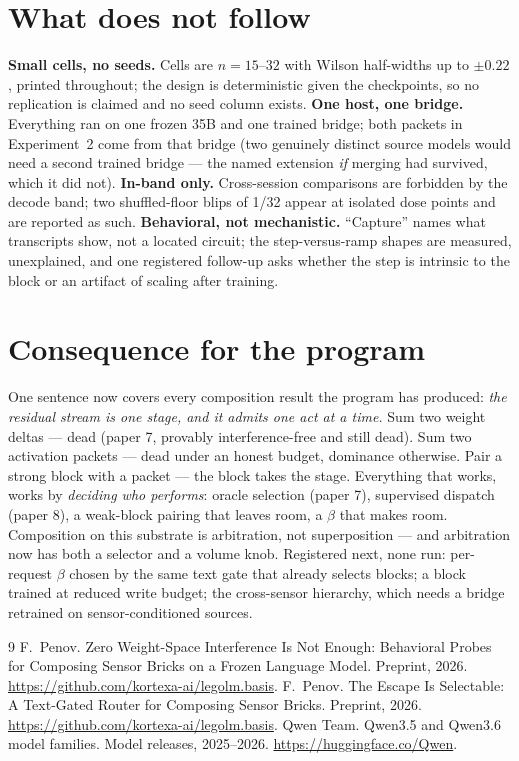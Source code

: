 \documentclass[11pt]{article}
\begin{document}
\section{What does not follow}

\textbf{Small cells, no seeds.} Cells are $n{=}15$--$32$ with Wilson
half-widths up to $\pm 0.22$, printed throughout; the design is
deterministic given the checkpoints, so no replication is claimed and no
seed column exists. \textbf{One host, one bridge.} Everything ran on one
frozen 35B and one trained bridge; both packets in Experiment~2 come from
that bridge (two genuinely distinct source models would need a second
trained bridge --- the named extension \emph{if} merging had survived,
which it did not). \textbf{In-band only.} Cross-session comparisons are
forbidden by the decode band; two shuffled-floor blips of 1/32 appear at
isolated dose points and are reported as such. \textbf{Behavioral, not
mechanistic.} ``Capture'' names what transcripts show, not a located
circuit; the step-versus-ramp shapes are measured, unexplained, and one
registered follow-up asks whether the step is intrinsic to the block or an
artifact of scaling after training.

\section{Consequence for the program}

One sentence now covers every composition result the program has produced:
\emph{the residual stream is one stage, and it admits one act at a time.}
Sum two weight deltas --- dead (paper 7, provably interference-free and
still dead). Sum two activation packets --- dead under an honest budget,
dominance otherwise. Pair a strong block with a packet --- the block takes
the stage. Everything that works, works by \emph{deciding who performs}:
oracle selection (paper 7), supervised dispatch (paper 8), a weak-block
pairing that leaves room, a $\beta$ that makes room. Composition on this
substrate is arbitration, not superposition --- and arbitration now has
both a selector and a volume knob. Registered next, none run: per-request
$\beta$ chosen by the same text gate that already selects blocks; a block
trained at reduced write budget; the cross-sensor hierarchy, which needs a
bridge retrained on sensor-conditioned sources.

\begin{thebibliography}{9}
 F.~Penov. Zero Weight-Space Interference
Is Not Enough: Behavioral Probes for Composing Sensor Bricks on a Frozen
Language Model. Preprint, 2026.
\url{https://github.com/kortexa-ai/legolm.basis}.
 F.~Penov. The Escape Is Selectable: A
Text-Gated Router for Composing Sensor Bricks. Preprint, 2026.
\url{https://github.com/kortexa-ai/legolm.basis}.
 Qwen Team. Qwen3.5 and Qwen3.6 model families. Model
releases, 2025--2026. \url{https://huggingface.co/Qwen}.
\end{thebibliography}
\end{document}
